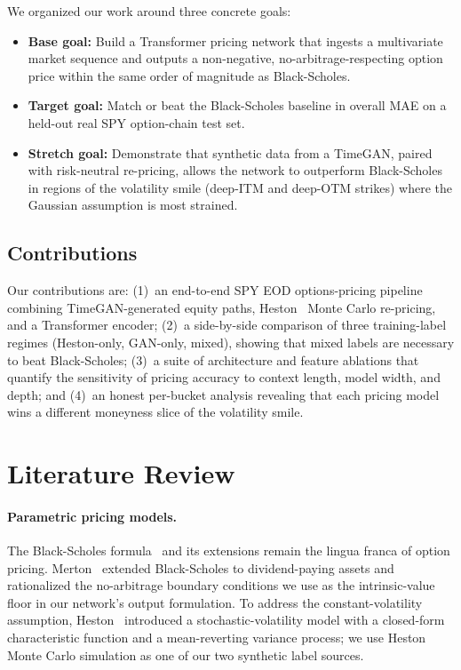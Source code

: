 \documentclass[conference]{IEEEtran}
\begin{document}
We organized our work around three concrete goals:
\begin{itemize}
\item \textbf{Base goal:} Build a Transformer pricing network
that ingests a multivariate market sequence and outputs a
non-negative, no-arbitrage-respecting option price within
the same order of magnitude as Black-Scholes.
\item \textbf{Target goal:} Match or beat the Black-Scholes
baseline in overall MAE on a held-out real SPY option-chain
test set.
\item \textbf{Stretch goal:} Demonstrate that synthetic data
from a TimeGAN, paired with risk-neutral re-pricing, allows
the network to outperform Black-Scholes in regions of the
volatility smile (deep-ITM and deep-OTM strikes) where the
Gaussian assumption is most strained.
\end{itemize}

\subsection{Contributions}

Our contributions are: (1)~an end-to-end SPY EOD options-pricing
pipeline combining TimeGAN-generated equity paths,
Heston~\cite{heston1993closed} Monte Carlo re-pricing, and a
Transformer encoder; (2)~a side-by-side comparison of three
training-label regimes (Heston-only, GAN-only, mixed), showing
that mixed labels are necessary to beat Black-Scholes; (3)~a
suite of architecture and feature ablations that quantify the
sensitivity of pricing accuracy to context length, model width,
and depth; and (4)~an honest per-bucket analysis revealing that
each pricing model wins a different moneyness slice of the
volatility smile.

\section{Literature Review}

\paragraph*{Parametric pricing models.}
The Black-Scholes formula~\cite{black1973pricing} and its
extensions remain the lingua franca of option pricing.
Merton~\cite{merton1973theory} extended Black-Scholes to
dividend-paying assets and rationalized the no-arbitrage
boundary conditions we use as the intrinsic-value floor in our
network's output formulation. To address the constant-volatility
assumption, Heston~\cite{heston1993closed} introduced a
stochastic-volatility model with a closed-form characteristic
function and a mean-reverting variance process; we use Heston
Monte Carlo simulation as one of our two synthetic label
sources.
\end{document}
